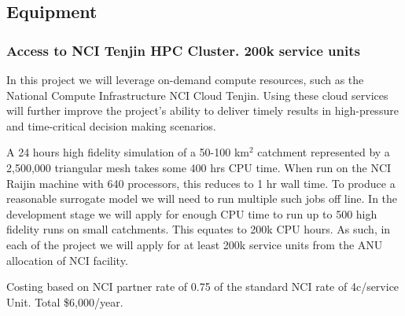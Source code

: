 \documentclass[a4paper,fontsize=12pt]{scrartcl}
\begin{document}
\subsection*{Equipment}







\subsubsection*{Access to NCI Tenjin HPC Cluster. 200k service units}

In this project we will leverage on-demand compute resources, 
such as the National Compute Infrastructure NCI Cloud Tenjin. 
Using these cloud services will further improve the project's 
ability to deliver timely results in high-pressure and 
time-critical decision making scenarios.

A 24 hours high fidelity simulation of a 50-100 km$^2$ catchment 
represented by a 2,500,000 triangular mesh takes 
some 400 hrs  CPU time. When run on the NCI Raijin machine 
with 640 processors, this reduces to 1 hr wall time.
To produce a reasonable surrogate model we will need to run multiple
such jobs off line.  
In the development stage we will apply for enough CPU time
to run up to 500 high fidelity runs on small catchments. 
This equates to 200k CPU hours.   
As such, in each of the project we will apply for at least
200k service units from the ANU allocation of NCI facility.  

Costing based on NCI partner rate of 0.75  of the standard 
NCI rate of 4c/service Unit. Total \$6,000/year. 
\end{document}
